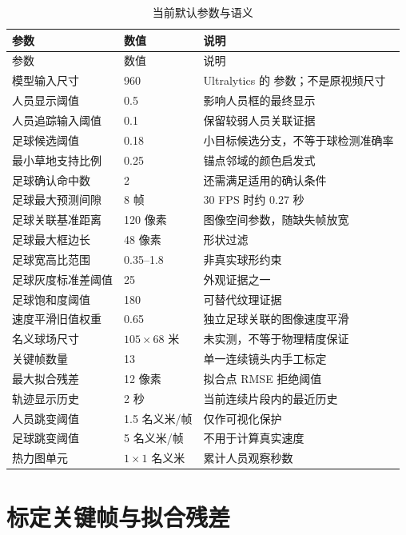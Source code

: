 \documentclass[UTF8,fontset=fandol,11pt,a4paper]{ctexart}
\newcommand{\code}[1]{\texttt{\detokenize{#1}}}
\begin{document}
\small
\begin{longtable}{@{}p{5.3cm}p{2.1cm}p{7.6cm}@{}}
\caption{当前默认参数与语义}\\
\toprule
参数 & 数值 & 说明\\
\midrule
\endfirsthead
\toprule 参数 & 数值 & 说明\\\midrule
\endhead
模型输入尺寸 & 960 & Ultralytics 的 \code{imgsz} 参数；不是原视频尺寸\\
人员显示阈值 & 0.5 & 影响人员框的最终显示\\
人员追踪输入阈值 & 0.1 & 保留较弱人员关联证据\\
足球候选阈值 & 0.18 & 小目标候选分支，不等于球检测准确率\\
最小草地支持比例 & 0.25 & 锚点邻域的颜色启发式\\
足球确认命中数 & 2 & 还需满足适用的确认条件\\
足球最大预测间隙 & 8 帧 & 30 FPS 时约 0.27 秒\\
足球关联基准距离 & 120 像素 & 图像空间参数，随缺失帧放宽\\
足球最大框边长 & 48 像素 & 形状过滤\\
足球宽高比范围 & 0.35--1.8 & 非真实球形约束\\
足球灰度标准差阈值 & 25 & 外观证据之一\\
足球饱和度阈值 & 180 & 可替代纹理证据\\
速度平滑旧值权重 & 0.65 & 独立足球关联的图像速度平滑\\
名义球场尺寸 & $105\times68$ 米 & 未实测，不等于物理精度保证\\
关键帧数量 & 13 & 单一连续镜头内手工标定\\
最大拟合残差 & 12 像素 & 拟合点 RMSE 拒绝阈值\\
轨迹显示历史 & 2 秒 & 当前连续片段内的最近历史\\
人员跳变阈值 & 1.5 名义米/帧 & 仅作可视化保护\\
足球跳变阈值 & 5 名义米/帧 & 不用于计算真实速度\\
热力图单元 & $1\times1$ 名义米 & 累计人员观察秒数\\
\bottomrule
\end{longtable}
\normalsize

\section{标定关键帧与拟合残差}
\end{document}
